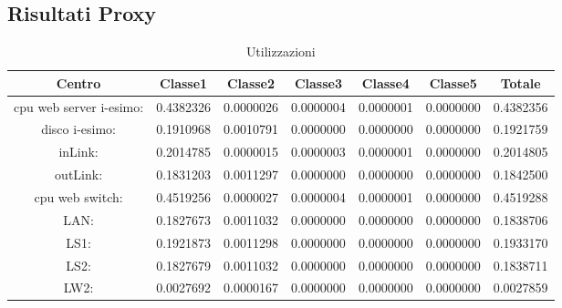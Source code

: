 \subsection{Risultati Proxy}
\begin{table}[H]
\begin{center}\begin{scriptsize}
\begin{tabular}{||c|c|c|c|c|c|c||}
\hline
Centro &Classe1 &Classe2 &Classe3 &Classe4 &Classe5 &Totale\\
\hline
\hline
 cpu web server i-esimo: 	&0.4382326	&0.0000026	&0.0000004	&0.0000001	&0.0000000	&0.4382356\\
\hline
 disco i-esimo: 	&0.1910968	&0.0010791	&0.0000000	&0.0000000	&0.0000000	&0.1921759\\
\hline
 inLink: 	&0.2014785	&0.0000015	&0.0000003	&0.0000001	&0.0000000	&0.2014805\\
\hline
 outLink: 	&0.1831203	&0.0011297	&0.0000000	&0.0000000	&0.0000000	&0.1842500\\
\hline
 cpu web switch: 	&0.4519256	&0.0000027	&0.0000004	&0.0000001	&0.0000000	&0.4519288\\
\hline
 LAN: 	&0.1827673	&0.0011032	&0.0000000	&0.0000000	&0.0000000	&0.1838706\\
\hline
 LS1: 	&0.1921873	&0.0011298	&0.0000000	&0.0000000	&0.0000000	&0.1933170\\
\hline
 LS2:	&0.1827679	&0.0011032	&0.0000000	&0.0000000	&0.0000000	&0.1838711\\
\hline
 LW2: 	&0.0027692	&0.0000167	&0.0000000	&0.0000000	&0.0000000	&0.0027859\\
\hline
\end{tabular}
\end{scriptsize}\end{center}
\caption{Utilizzazioni}
\label{utilizzazioni}
\end{table}

